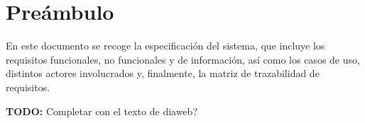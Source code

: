 \chapter{Preámbulo}
\label{anexo1:cap:preambulo}
En este documento se recoge la especificación del sistema, que incluye los requisitos funcionales,
no funcionales y de información, así como los casos de uso, distintos actores involucrados y,
finalmente, la matriz de trazabilidad de requisitos.\endgraf

\textbf{TODO:} Completar con el texto de diaweb?
